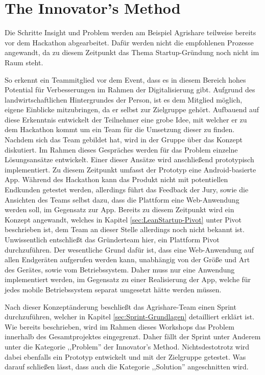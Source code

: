 \section{The Innovator's Method}
Die Schritte Insight und Problem werden am Beispiel Agrishare teilweise bereits vor dem Hackathon abgearbeitet. Dafür werden nicht die empfohlenen Prozesse angewandt, da zu diesem Zeitpunkt das Thema Startup-Gründung noch nicht im Raum steht.

So erkennt ein Teammitglied vor dem Event, dass es in diesem Bereich hohes Potential für Verbesserungen im Rahmen der Digitalisierung gibt. Aufgrund des landwirtschaftlichen Hintergrundes der Person, ist es dem Mitglied möglich, eigene Einblicke mitzubringen, da er selbst zur Zielgruppe gehört. Aufbauend auf diese Erkenntnis entwickelt der Teilnehmer eine grobe Idee, mit welcher er zu dem Hackathon kommt um ein Team für die Umsetzung dieser zu finden. Nachdem sich das Team gebildet hat, wird in der Gruppe über das Konzept diskutiert. Im Rahmen dieses Gespräches werden für das Problem einzelne Lösungsansätze entwickelt. Einer dieser Ansätze wird anschließend prototypisch implementiert. Zu diesem Zeitpunkt umfasst der Prototyp eine Android-basierte App. Während des Hackathon kann das Produkt nicht mit potentiellen Endkunden getestet werden, allerdings führt das Feedback der Jury, sowie die Ansichten des Teams selbst dazu, dass die Plattform eine Web-Anwendung werden soll, im Gegensatz zur App. Bereits zu diesem Zeitpunkt wird ein Konzept angewandt, welches in Kapitel \ref{sec:LeanStartup-Pivot} unter Pivot beschrieben ist, dem Team an dieser Stelle allerdings noch nicht bekannt ist. Unwissentlich entschließt das Gründerteam hier, ein Plattform Pivot durchzuführen. Der wesentliche Grund dafür ist, dass eine Web-Anwendung auf allen Endgeräten aufgerufen werden kann, unabhängig von der Größe und Art des Gerätes, sowie vom Betriebssystem. Daher muss nur eine Anwendung implementiert werden, im Gegensatz zu einer Realisierung der App, welche für jedes mobile Betriebssystem separat umgesetzt hätte werden müssen.

Nach dieser Konzeptänderung beschließt das Agrishare-Team einen Sprint durchzuführen, welcher in Kapitel \ref{sec:Sprint-Grundlagen} detailliert erklärt ist. Wie bereits beschrieben, wird im Rahmen dieses Workshops das Problem innerhalb des Gesamtprojektes eingegrenzt. Daher fällt der Sprint unter Anderem unter die Kategorie ,,Problem'' der Innovator's Method. Nichtsdestotrotz wird dabei ebenfalls ein Prototyp entwickelt und mit der Zielgruppe getestet. Was darauf schließen lässt, dass auch die Kategorie ,,Solution'' angeschnitten wird.